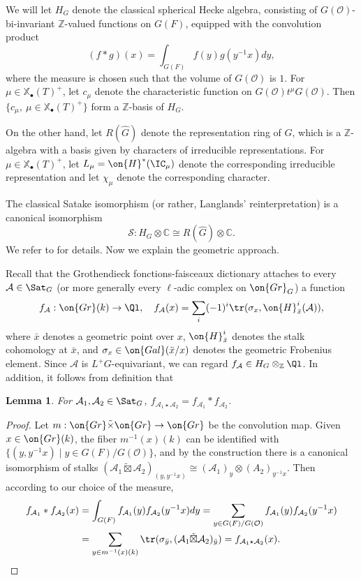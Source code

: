 \documentclass[]{pcmi}
\theoremstyle{plain}
\newtheorem{lem}[equation]{Lemma}
\theoremstyle{remark}
\theoremstyle{definition}
\newcommand{\bC}{{\mathbb C}}
\newcommand{\bZ}{{\mathbb Z}}
\newcommand{\mA}{{\mathcal A}}
\newcommand{\mO}{{\mathcal O}}
\newcommand{\mS}{{\mathcal S}}
\newcommand{\Gal}{{\on{Gal}}}
\newcommand{\Gr}{{\on{Gr}}}
\def\xcoch{\mathbb{X}_\bullet}
\begin{document}
We will let $H_G$ denote the classical spherical Hecke algebra, consisting of $G(\mO)$-bi-invariant $\bZ$-valued functions on $G(F)$, equipped with the convolution product
\[(f*g)(x)=\int_{G(F)}f(y)g(y^{-1}x)dy,\]
where the measure is chosen such that the volume of $G(\mO)$ is $1$. For $\mu\in \xcoch(T)^+$, let $c_\mu$ denote the characteristic function on $G(\mO)t^\mu G(\mO)$. Then $\{c_\mu,\ \mu\in\xcoch(T)^+\}$ form a $\bZ$-basis of $H_G$.

On the other hand, let $R(\hat G)$ denote the representation ring of $\hat G$, which is a $\bZ$-algebra with a basis given by characters of irreducible representations. For $\mu\in\xcoch(T)^+$, let $L_\mu=\on{H}^*(\IC_\mu)$ denote the corresponding irreducible representation and let $\chi_\mu$ denote the corresponding character.

The classical Satake isomorphism (or rather, Langlands' reinterpretation) is a canonical isomorphism
\[\mS: H_G\otimes\bC\cong R(\hat G)\otimes\bC.\]
We refer to \cite{Gr} for details.
Now we explain the geometric approach.

Recall that the Grothendieck fonctions-faisceaux dictionary attaches to every $\mA\in \Sat_G$ (or more generally every $\ell$-adic complex on $\Gr_G$) a function 
\[f_\mA: \Gr(k)\to \Ql,\quad f_\mA(x)=\sum_i(-1)^i\tr(\sigma_x, \on{H}^i_{\bar x}(\mA)),\]
where $\bar x$ denotes a geometric point over $x$, $\on{H}^i_{\bar x}$ denotes the stalk cohomology at $\bar x$, and $\sigma_x\in \Gal(\bar x/x)$ denotes the geometric Frobenius element. Since $\mA$ is $L^+G$-equivariant, we can regard $f_\mA\in H_G\otimes_\bZ\Ql$. In addition, it follows from definition that
\begin{lem}\label{conv vs classical conv}
For $\mA_1,\mA_2\in\Sat_G$,
$f_{\mA_1\star\mA_2}=f_{\mA_1}*f_{\mA_2}$.
\end{lem}
\begin{proof}Let $m:\Gr\tilde\times\Gr\to \Gr$ be the convolution map. Given $x\in \Gr(k)$, the fiber $m^{-1}(x)(k)$ can be identified with $\{(y, y^{-1}x)\mid y\in G(F)/G(\mO)\}$, and by the construction there is a canonical isomorphism of stalks $(\mA_1\tilde\boxtimes\mA_2)_{(y,y^{-1}x)}\cong (\mA_1)_y\otimes(A_2)_{y^{-1}x}$. Then according to our choice of the measure, 
\[\begin{split}
f_{\mA_1}*f_{\mA_2}(x)&=\int_{G(F)}f_{\mA_1}(y)f_{\mA_2}(y^{-1}x)dy=\sum_{y\in G(F)/G(\mO)}f_{\mA_1}(y)f_{\mA_2}(y^{-1}x)\\
&=\sum_{y\in m^{-1}(x)(k)} \tr(\sigma_{\bar y}, (\mA_1\tilde\boxtimes\mA_2)_{\bar y})=f_{\mA_1\star\mA_2}(x).
\end{split}\]
\end{proof}
\end{document}
